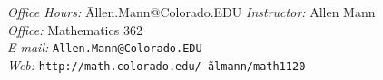 \documentclass[11pt]{article}
\newcommand{\url}[1]{\texttt{#1}}
\begin{document}
\begin{center}
\end{center}


\begin{tabbing}
\textit{Office Hours:} \quad   \= Allen.Mann@Colorado.EDU   \kill
\textit{Instructor:}		\> Allen Mann \\
\textit{Office:}			\> Mathematics 362 \\
\textit{E-mail:}			\> \url{Allen.Mann@Colorado.EDU} \\
\textit{Web:}			\> \url{http://math.colorado.edu/\~\,$\!$almann/math1120}
\end{tabbing}

\vspace{-0.2 in}
\end{document}
